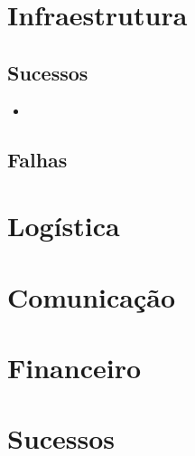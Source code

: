 \documentclass[12pt]{article}
\begin{document}
\section*{Infraestrutura}

\subsection{Sucessos}

\begin{itemize}
\item 
\end{itemize}


\subsection{Falhas}

\newpage

\section*{Logística}


\newpage

\section*{Comunicação}


\newpage

\section*{Financeiro}


\newpage

\section*{Sucessos}
\end{document}
